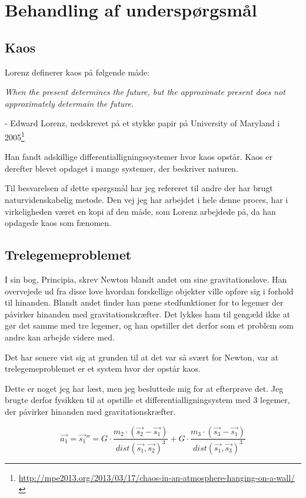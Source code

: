 \documentclass[12pt,a4paper]{article}
\theoremstyle{break}
\theoremstyle{nonumberplain}
\begin{document}
\section{Behandling af underspørgsmål}

\subsection{Kaos}
Lorenz definerer kaos på følgende måde:
\begin{displayquote}
\textit{When the present determines the future, but the approximate present does not approximately determain the future.}

- Edward Lorenz, nedskrevet på et stykke papir på University of Maryland i 2005\footnote{\url{http://mpe2013.org/2013/03/17/chaos-in-an-atmosphere-hanging-on-a-wall/}}

\end{displayquote}
	
Han fandt adskillige differentialligningssystemer hvor kaos opstår.
Kaos er derefter blevet opdaget i mange systemer, der beskriver naturen. 

Til besvarelsen af dette spørgsmål har jeg refereret til andre der har brugt naturvidenskabelig metode. 
Den vej jeg har arbejdet i hele denne proces, har i virkeligheden været en kopi af den måde, som Lorenz arbejdede på, da han opdagede kaos som fænomen.

\subsection{Trelegemeproblemet}
I sin bog, Principia, skrev Newton blandt andet om sine gravitationslove. 
Han overvejede ud fra disse love hvordan forskellige objekter ville opføre sig i forhold til hinanden. 
Blandt andet finder han pæne stedfunktioner for to legemer der påvirker hinanden med gravitationskræfter. 
Det lykkes ham til gengæld ikke at gør det samme med tre legemer, og han opstiller det derfor som et problem som andre kan arbejde videre med. 

Det har senere vist sig at grunden til at det var så svært for Newton, var at trelegemeproblemet er et system hvor der opstår kaos. 

Dette er noget jeg har læst, men jeg besluttede mig for at efterprøve det. 
Jeg brugte derfor fysikken til at opstille et differentialligningsystem med 3 legemer, der påvirker hinanden med gravitationskræfter. 


$$\vec{a_1} = \vec{s_1}'' = G \cdot \dfrac{m_2 \cdot (\vec{s_2} - \vec{s_1})}{dist(\vec{s_1}, \vec{s_2})^3} + G \cdot \dfrac{m_3 \cdot (\vec{s_3} - \vec{s_1})}{dist(\vec{s_1}, \vec{s_3})^3}
$$
\end{document}
